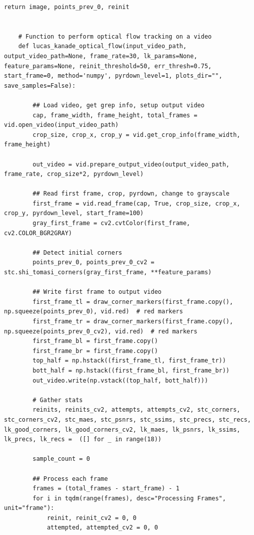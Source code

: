 \documentclass[11pt, conference, letterpaper]{IEEEtran}
\begin{document}
\begin{lstlisting}[style=python, caption={\texttt{lucas\_kanade.py}}, label={lst:lk}]
            return image, points_prev_0, reinit
    
    
    # Function to perform optical flow tracking on a video
    def lucas_kanade_optical_flow(input_video_path, output_video_path=None, frame_rate=30, lk_params=None, feature_params=None, reinit_threshold=50, err_thresh=0.75, start_frame=0, method='numpy', pyrdown_level=1, plots_dir="", save_samples=False):
    
        ## Load video, get grep info, setup output video
        cap, frame_width, frame_height, total_frames = vid.open_video(input_video_path)
        crop_size, crop_x, crop_y = vid.get_crop_info(frame_width, frame_height)
    
        out_video = vid.prepare_output_video(output_video_path, frame_rate, crop_size*2, pyrdown_level)
        
        ## Read first frame, crop, pyrdown, change to grayscale
        first_frame = vid.read_frame(cap, True, crop_size, crop_x, crop_y, pyrdown_level, start_frame=100)
        gray_first_frame = cv2.cvtColor(first_frame, cv2.COLOR_BGR2GRAY)
    
        ## Detect initial corners
        points_prev_0, points_prev_0_cv2 = stc.shi_tomasi_corners(gray_first_frame, **feature_params)
        
        ## Write first frame to output video
        first_frame_tl = draw_corner_markers(first_frame.copy(), np.squeeze(points_prev_0), vid.red)  # red markers
        first_frame_tr = draw_corner_markers(first_frame.copy(), np.squeeze(points_prev_0_cv2), vid.red)  # red markers
        first_frame_bl = first_frame.copy()
        first_frame_br = first_frame.copy()
        top_half = np.hstack((first_frame_tl, first_frame_tr))
        bott_half = np.hstack((first_frame_bl, first_frame_br))
        out_video.write(np.vstack((top_half, bott_half)))
    
        # Gather stats
        reinits, reinits_cv2, attempts, attempts_cv2, stc_corners, stc_corners_cv2, stc_maes, stc_psnrs, stc_ssims, stc_precs, stc_recs, lk_good_corners, lk_good_corners_cv2, lk_maes, lk_psnrs, lk_ssims, lk_precs, lk_recs =  ([] for _ in range(18))
        
        sample_count = 0
        
        ## Process each frame
        frames = (total_frames - start_frame) - 1
        for i in tqdm(range(frames), desc="Processing Frames", unit="frame"):
            reinit, reinit_cv2 = 0, 0
            attempted, attempted_cv2 = 0, 0
                       

\end{lstlisting}
\end{document}
